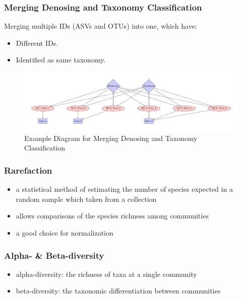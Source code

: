 \documentclass{beamer}
\begin{document}
    \begin{frame}
        \frametitle{Merging Denosing and Taxonomy Classification}

        Merging multiple IDs (ASVs and OTUs) into one, which have:
        \begin{itemize}
            \item Different IDs.
            \item Identified as same taxonomy.
        \end{itemize}

        \begin{figure}
            \includegraphics[width=0.6 \linewidth]{figures/Merging/merging.pdf}
            \caption{Example Diagram for Merging Denosing and Taxonomy Classification}
        \end{figure}
    \end{frame}

    \begin{frame}
        \frametitle{Rarefaction}

        \begin{itemize}
            \item a statistical method of estimating the number of species expected in a random sample which taken from a collection \cite{rarefaction1}
            \item allows comparisons of the species richness among communities
            \item a good choice for normalization \cite{rarefaction2}
        \end{itemize}
    \end{frame}

    \begin{frame}
        \frametitle{Alpha- \& Beta-diversity}

        \begin{itemize}
            \item alpha-diversity: the richness of taxa at a single community
            \item beta-diversity: the taxonomic differentiation between communities
        \end{itemize}
    \end{frame}
\end{document}
